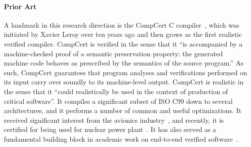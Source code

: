 
\paragraph{Prior Art}

A landmark in this research direction is the CompCert C compiler~\cite{compcert}, which was
initiated by Xavier Leroy over ten years ago and then grows as the first realistic verified
compiler.  CompCert is verified in the sense that it ``is accompanied by a machine-checked proof of
a semantic preservation property: the generated machine code behaves as prescribed by the semantics
of the source program.''  As such, CompCert guarantees that program analyses and verifications
performed on its input carry over soundly to its machine-level output.  CompCert is realistic in the
sense that it ``could realistically be used in the context of production of critical software''.  It
compiles a significant subset of ISO C99 down to several architectures, and it performs a number of
common and useful optimizations.  It received significant interest from the avionics
industry~\cite{TODO}, and recently, it is certified for being used for nuclear power
plant~\cite{compcert-nuclear}.  It has also served as a fundamental building block in academic work
on end-to-end verified software~\cite{TODO}.


